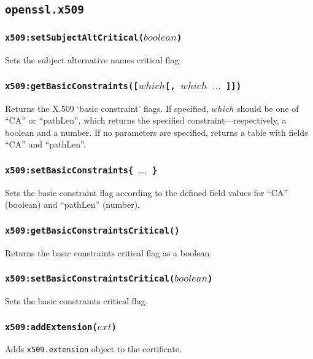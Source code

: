 \documentclass[11pt, oneside]{memoir}
\newcommand*{\fn}[1]{\texttt{#1}\xspace}
\newcommand*{\module}[1]{\texttt{#1}\xspace}
\newcounter{toccols}
\newenvironment{Module}[1]{
	\subsection{\texttt{#1}}
	\addtocontents{toc}{
		\protect\begin{multicols}{\value{toccols}}
	}
}{
	\addtocontents{toc}{\protect\end{multicols}}
}
\begin{document}
\begin{Module}{openssl.x509}
\subsubsection[\fn{x509:setSubjectAltCritical}]{\fn{x509:setSubjectAltCritical($boolean$)}}

Sets the subject alternative names critical flag.

\subsubsection[\fn{x509:getBasicConstraints}]{\fn{x509:getBasicConstraints([$which$[, $which$ $\ldots$ ]])}}

Returns the X.509 `basic constraint' flags. If specified, $which$ should be one of ``CA'' or ``pathLen'', which returns the specified constraint---respectively, a boolean and a number.  If no parameters are specified, returns a table with fields ``CA'' and ``pathLen''.

\subsubsection[\fn{x509:setBasicConstraints}]{\fn{x509:setBasicConstraints\{ $\ldots$ \}}}

Sets the basic constraint flag according to the defined field values for ``CA'' (boolean) and ``pathLen'' (number).

\subsubsection[\fn{x509:getBasicConstraintsCritical}]{\fn{x509:getBasicConstraintsCritical()}}

Returns the basic constraints critical flag as a boolean.

\subsubsection[\fn{x509:setBasicConstraintsCritical}]{\fn{x509:setBasicConstraintsCritical($boolean$)}}

Sets the basic constraints critical flag.

\subsubsection[\fn{x509:addExtension}]{\fn{x509:addExtension($ext$)}}

Adds \module{x509.extension} object to the certificate. 


\end{Module}
\end{document}
